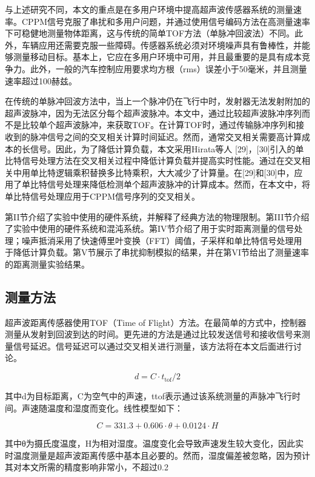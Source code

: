 与上述研究不同，本文的重点是在多用户环境中提高超声波传感器系统的测量速率。CPPM信号克服了串扰和多用户问题，并通过使用信号编码方法在高测量速率下可稳健地测量物体距离，这与传统的简单TOF方法（单脉冲回波法）不同。此外，车辆应用还需要克服一些障碍。传感器系统必须对环境噪声具有鲁棒性，并能够测量移动目标。基本上，它应在多用户环境中可用，并且最重要的是具有成本竞争力。此外，一般的汽车控制应用要求均方根（rms）误差小于50毫米，并且测量速率超过100赫兹。

在传统的单脉冲回波方法中，当上一个脉冲仍在飞行中时，发射器无法发射附加的超声波脉冲，因为无法区分每个超声波脉冲。本文中，通过比较超声波脉冲序列而不是比较单个超声波脉冲，来获取TOF。在计算TOF时，通过传输脉冲序列和接收到的脉冲信号之间的交叉相关计算时间延迟。然而，通常交叉相关需要高计算成本的长信号。因此，为了降低计算负载，本文采用Hirata等人 [29]，[30]引入的单比特信号处理方法在交叉相关过程中降低计算负载并提高实时性能。通过在交叉相关中用单比特逻辑乘积替换多比特乘积，大大减少了计算量。在[29]和[30]中，应用了单比特信号处理来降低检测单个超声波脉冲的计算成本。然而，在本文中，将单比特信号处理应用于CPPM信号序列的交叉相关。

第II节介绍了实验中使用的硬件系统，并解释了经典方法的物理限制。第III节介绍了实验中使用的硬件系统和混沌系统。第IV节介绍了用于实时距离测量的信号处理；噪声抵消采用了快速傅里叶变换（FFT）阈值，子采样和单比特信号处理用于降低计算负载。第V节展示了串扰抑制模拟的结果，并在第VI节给出了测量速率的距离测量实验结果。

\subsection{测量方法}
超声波距离传感器使用TOF（Time of Flight）方法。在最简单的方式中，控制器测量从发射到回波到达的时间。更先进的方法是通过比较发送信号和接收信号来测量信号延迟。信号延迟可以通过交叉相关进行测量，该方法将在本文后面进行讨论。

\begin{equation*} d = C \cdot t_{\text {tof}}/2 \tag{1}\end{equation*}

其中d为目标距离，C为空气中的声速，ttof表示通过该系统测量的声脉冲飞行时间。声速随温度和湿度而变化。线性模型如下：

\begin{equation*} C = 331.3 + 0.606 \cdot \theta + 0.0124 \cdot H \tag{2}\end{equation*}

其中θ为摄氏度温度，H为相对湿度。温度变化会导致声速发生较大变化，因此实时温度测量是超声波距离传感中基本且必要的。然而，湿度偏差被忽略，因为预计其对本文所需的精度影响非常小，不超过0.2%

